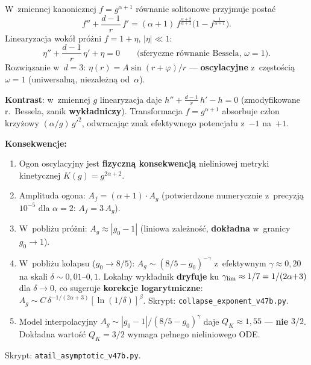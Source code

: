 \begin{proposition}%
\label{prop:T-oscillatory-tail}
W~zmiennej kanonicznej $f = g^{\alpha+1}$ r\'ownanie solitonowe
przyjmuje posta\'c
\[
  f'' + \frac{d{-}1}{r}\,f' = (\alpha{+}1)\,f^{\frac{\alpha+2}{\alpha+1}}
  \bigl(1 - f^{\frac{1}{\alpha+1}}\bigr).
\]
Linearyzacja wok\'o\l{} pr\'o\.zni $f = 1 + \eta$, $|\eta| \ll 1$:
\[
  \eta'' + \frac{d{-}1}{r}\,\eta' + \eta = 0
  \qquad\text{(sferyczne r\'ownanie Bessela, $\omega = 1$)}.
\]
Rozwiązanie w~$d = 3$: $\eta(r) = A\sin(r + \varphi)/r$ ---
\textbf{oscylacyjne} z~cz\k{e}sto\'sci\k{a} $\omega = 1$ (uniwersaln\k{a},
niezale\.zn\k{a} od~$\alpha$).

\medskip\noindent
\textbf{Kontrast}: w~zmiennej $g$ linearyzacja daje
$h'' + \frac{d{-}1}{r}\,h' - h = 0$
(zmodyfikowane r.\ Bessela, zanik \textbf{wyk\l{}adniczy}).
Transformacja $f = g^{\alpha+1}$ absorbuje cz\l{}on krzy\.zowy
$(\alpha/g)\,g'^2$, odwracaj\k{a}c znak efektywnego potencja\l{}u
z~$-1$ na~$+1$.

\medskip\noindent
\textbf{Konsekwencje:}
\begin{enumerate}[nosep]
  \item Ogon oscylacyjny jest \textbf{fizyczn\k{a} konsekwencj\k{a}}
    nieliniowej metryki kinetycznej $K(g) = g^{2\alpha+2}$.
  \item Amplituda ogona: $A_f = (\alpha{+}1)\cdot A_g$
    (potwierdzone numerycznie z~precyzj\k{a} $10^{-5}$
    dla $\alpha = 2$: $A_f = 3\,A_g$).
  \item W~pobli\.zu pr\'o\.zni: $A_g \approx |g_0 - 1|$
    (liniowa zale\.zno\'s\'c, \textbf{dok\l{}adna} w~granicy $g_0 \to 1$).
  \item W~pobli\.zu kolapsu ($g_0 \to 8/5$):
    $A_g \sim (8/5 - g_0)^{-\gamma}$ z~efektywnym $\gamma \approx 0{,}20$
    na skali $\delta \sim 0{,}01$--$0{,}1$.
    Lokalny wyk\l{}adnik \textbf{dryfuje} ku $\gamma_{\rm lim}
    \approx 1/7 = 1/(2\alpha{+}3)$ dla $\delta \to 0$,
    co sugeruje \textbf{korekcje logarytmiczne}:
    $A_g \sim C\,\delta^{-1/(2\alpha+3)}[\ln(1/\delta)]^\beta$.
    Skrypt: \texttt{collapse\_exponent\_v47b.py}.
  \item Model interpolacyjny $A_g \sim |g_0 {-} 1|/(8/5 {-} g_0)^\gamma$
    daje $Q_K \approx 1{,}55$ --- \textbf{nie} $3/2$.
    Dok\l{}adna warto\'s\'c $Q_K = 3/2$ wymaga pe\l{}nego nieliniowego ODE.
\end{enumerate}
Skrypt: \texttt{atail\_asymptotic\_v47b.py}.
\end{proposition}

